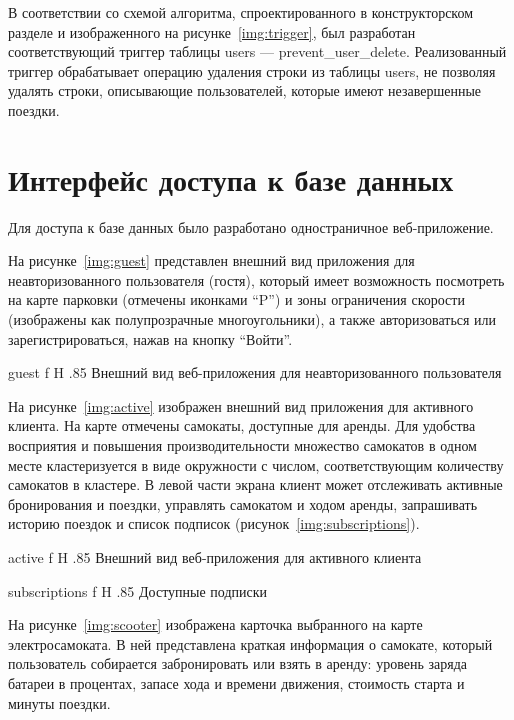 В соответствии со схемой алгоритма, спроектированного в конструкторском разделе и изображенного на рисунке~\ref{img:trigger}, был разработан соответствующий триггер таблицы users --- prevent\_user\_delete. Реализованный триггер обрабатывает операцию удаления строки из таблицы users, не позволяя удалять строки, описывающие пользователей, которые имеют незавершенные поездки.

\vspace{.25cm}

\section{Интерфейс доступа к базе данных}

Для доступа к базе данных было разработано одностраничное веб-приложение.

На рисунке~\ref{img:guest} представлен внешний вид приложения для неавторизованного пользователя (гостя), который имеет возможность посмотреть на карте парковки (отмечены иконками \enquote{P}) и зоны ограничения скорости (изображены как полупрозрачные многоугольники), а также авторизоваться или зарегистрироваться, нажав на кнопку \enquote{Войти}.

{guest}
{f}
{H}
{.85\textwidth}
{Внешний вид веб-приложения для неавторизованного пользователя}

На рисунке~\ref{img:active} изображен внешний вид приложения для активного клиента. На карте отмечены самокаты, доступные для аренды. Для удобства восприятия и повышения производительности множество самокатов в одном месте кластеризуется в виде окружности с числом, соответствующим количеству самокатов в кластере. В левой части экрана клиент может отслеживать активные бронирования и поездки, управлять самокатом и ходом аренды, запрашивать историю поездок и список подписок (рисунок~\ref{img:subscriptions}).

{active}
{f}
{H}
{.85\textwidth}
{Внешний вид веб-приложения для активного клиента}

{subscriptions}
{f}
{H}
{.85\textwidth}
{Доступные подписки}

На рисунке~\ref{img:scooter} изображена карточка выбранного на карте электросамоката. В ней представлена краткая информация о самокате, который пользователь собирается забронировать или взять в аренду: уровень заряда батареи в процентах, запасе хода и времени движения, стоимость старта и минуты поездки.

